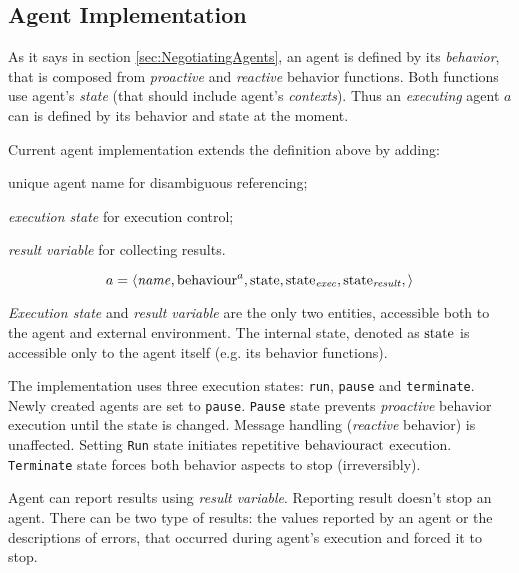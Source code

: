 \documentclass[../ThesisDoc]{subfiles}
\begin{document}
\providecommand{\rootdir}{..}


\subsection{Agent Implementation}


As it says in section \ref{sec:NegotiatingAgents}, an agent is defined by its
\emph{behavior}, that is composed from \emph{proactive} and \emph{reactive}
behavior functions. Both functions use agent's \emph{state} (that should include
agent's \emph{contexts}). Thus an \emph{executing} agent $a$ can is defined by
its behavior and state at the moment.

Current agent implementation extends the definition above by adding:
\begin{enumerate*}[1)]
  \item unique agent name for disambiguous referencing;
  \item \emph{execution state} for execution control;
  \item \emph{result variable} for collecting results.
\end{enumerate*}

$$ a = \left< \mathit{name},
              \mathrm{behaviour}^a,
              \mathrm{state},
              \mathrm{state}_\mathit{exec},
              \mathrm{state}_\mathit{result},
       \right> $$

\noindent
\emph{Execution state} and \emph{result variable} are the only two entities,
accessible both to the agent and external environment. The internal state,
denoted as $\mathrm{state}$ is accessible only to the agent itself (e.g. its behavior functions).


The implementation uses three execution states: \texttt{run}, \texttt{pause}
and \texttt{terminate}. Newly created agents are set to \texttt{pause}.
\texttt{Pause} state prevents \emph{proactive} behavior execution until the state is changed.
Message handling (\emph{reactive} behavior) is unaffected.
Setting \texttt{Run} state initiates repetitive $\mathrm{behaviour}\mathrm{act}$ execution.
\texttt{Terminate} state forces both behavior aspects to stop (irreversibly).

Agent can report results using \emph{result variable}.
Reporting result doesn't stop an agent.
There can be two type of results: the values reported by an agent or
the descriptions of errors, that occurred during agent's execution
and forced it to stop.
\end{document}
